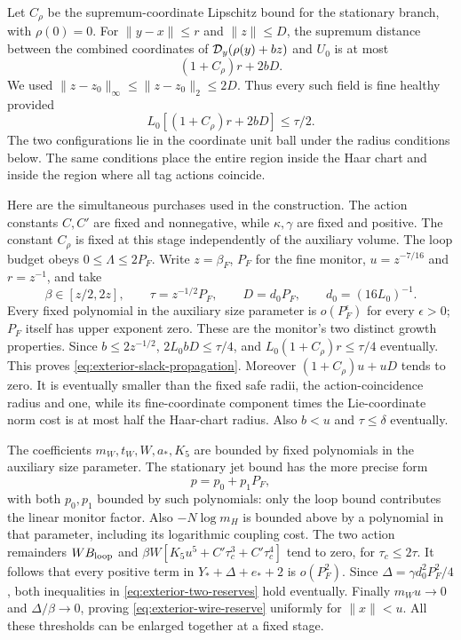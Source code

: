 Let $C_\rho$ be the supremum-coordinate Lipschitz bound for the stationary
branch, with $\rho(0)=0$. For $\|y-x\|\le r$ and $\|z\|\le D$,
the supremum distance between the combined coordinates of
${\cal D}_y(\rho(y)+bz)$ and $U_0$ is at most
\[
                       (1+C_\rho)r+2bD.
\]
We used $\|z-z_0\|_\infty\le\|z-z_0\|_2\le2D$.
Thus every such field is fine healthy provided
\begin{equation}\label{eq:exterior-slack-propagation}
                  L_0[(1+C_\rho)r+2bD]\le\tau/2.
\end{equation}
The two configurations lie in the coordinate unit ball under the
radius conditions below. The same conditions place the entire
region inside the Haar chart and inside the region where all tag
actions coincide.

Here are the simultaneous purchases used in the construction.
The action constants $C,C'$ are fixed and nonnegative, while
$\kappa,\gamma$ are fixed and positive. The constant $C_\rho$
is fixed at this stage independently of the auxiliary volume.
The loop budget obeys $0\le\Lambda\le2P_F$.
Write $z=\beta_F$, $P_F$ for the fine monitor,
$u=z^{-7/16}$ and $r=z^{-1}$, and take
\[
 \beta\in[z/2,2z],\qquad \tau=z^{-1/2}P_F,\qquad
       D=d_0P_F,\qquad d_0=(16L_0)^{-1}.
\]
Every fixed polynomial in the auxiliary size parameter is
$o(P_F^\epsilon)$ for every $\epsilon>0$; $P_F$ itself has upper
exponent zero. These are the monitor's two distinct growth
properties. Since $b\le2z^{-1/2}$,
$2L_0bD\le\tau/4$, and
$L_0(1+C_\rho)r\le\tau/4$ eventually. This proves
\eqref{eq:exterior-slack-propagation}. Moreover
$(1+C_\rho)u+uD$ tends to zero. It is eventually smaller than the
fixed safe radii, the action-coincidence radius and one, while its
fine-coordinate component times the Lie-coordinate norm cost is
at most half the Haar-chart radius. Also $b<u$ and
$\tau\le\delta$ eventually.

The coefficients $m_W,t_W,W,a_*,K_5$ are bounded by fixed
polynomials in the auxiliary size parameter. The stationary jet
bound has the more precise form
\[
                         p=p_0+p_1P_F,
\]
with both $p_0,p_1$ bounded by such polynomials: only the loop
bound contributes the linear monitor factor. Also
$-N\log m_H$ is bounded above by a polynomial in that parameter,
including its logarithmic coupling cost.
The two action remainders
$WB_{\rm loop}$ and
$\beta W[K_5u^5+C'\tau_c^3+C'\tau_c^4]$
tend to zero, for $\tau_c\le2\tau$.
It follows that every positive term in $Y_*+\Delta+e_*+2$ is
$o(P_F^2)$. Since $\Delta=\gamma d_0^2P_F^2/4$, both inequalities
in \eqref{eq:exterior-two-reserves} hold eventually. Finally
$m_Wu\to0$ and $\Delta/\beta\to0$, proving
\eqref{eq:exterior-wire-reserve} uniformly for $\|x\|<u$.
All these thresholds can be enlarged together at a fixed stage.

